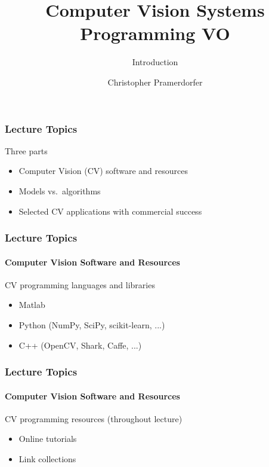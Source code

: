 \documentclass[xetex,professionalfont]{beamer}
\title{Computer Vision Systems Programming VO}
\subtitle{Introduction}
\author{Christopher Pramerdorfer}
\institute{Computer Vision Lab, Vienna University of Technology}
\begin{document}

\begin{frame}
\maketitle
\end{frame}


\begin{frame}
\frametitle{Lecture Topics}

Three parts
\begin{itemize}
	\item Computer Vision (CV) software and resources
	\item Models vs.\ algorithms
	\item Selected CV applications with commercial success
\end{itemize}

\end{frame}


\begin{frame}
\frametitle{Lecture Topics}
\framesubtitle{Computer Vision Software and Resources}

CV programming languages and libraries
\begin{itemize}
	\item Matlab
	\item Python (NumPy, SciPy, scikit-learn, ...)
	\item C++ (OpenCV, Shark, Caffe, ...)
\end{itemize}

\end{frame}


\begin{frame}
\frametitle{Lecture Topics}
\framesubtitle{Computer Vision Software and Resources}

CV programming resources (throughout lecture)
\begin{itemize}
	\item Online tutorials
	\item Link collections
\end{itemize}

\end{frame}
\end{document}
